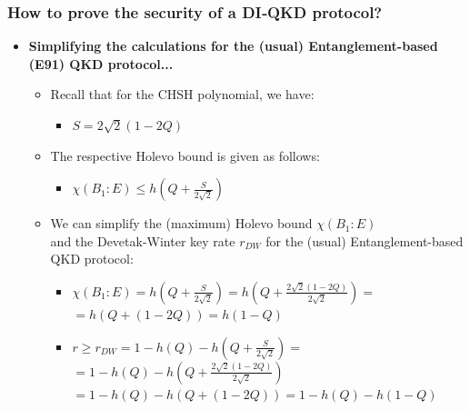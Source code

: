 \documentclass{beamer}
\begin{document}
		\begin{frame}
			\frametitle{\large How to prove the security of a DI‑QKD protocol?}

            \vspace{4ex}
            \begin{itemize}
                \item \textbf{Simplifying the calculations for the (usual) Entanglement-based (E91) QKD protocol...}
                \begin{itemize}
                    \item Recall that for the CHSH polynomial, we have:
                    \begin{itemize}\footnotesize
                        \item $S = 2 \sqrt{2}(1 - 2Q)$
                    \end{itemize}
                    \vspace{0.5ex}
                    \item The respective Holevo bound is given as follows:
                    \begin{itemize}\footnotesize
                        \item $\chi({B}_{1}:E) \leq h\left( Q + \frac{S}{2 \sqrt{2}} \right)$
                    \end{itemize}
                    \vspace{0.5ex}
                    \item We can simplify the (maximum) Holevo bound $\chi({B}_{1}:E)$\\ and the Devetak-Winter key rate ${r}_{DW}$ for the (usual) Entanglement-based QKD protocol:
                    \begin{itemize}\footnotesize
                        \item $\chi({B}_{1}:E) = h\left( Q + \frac{S}{2 \sqrt{2}} \right) = h\left( Q + \frac{2 \sqrt{2}(1 - 2Q)}{2 \sqrt{2}} \right) = $\\
                        \vspace{0.5ex}
                        \hspace{8ex}
                        $ = h\left( Q + (1 - 2Q) \right) = h\left( 1 - Q \right)$
                        \item $r \geq {r}_{DW} = 1 - h(Q) - h\left( Q + \frac{S}{2 \sqrt{2}} \right) = $\\
                        \vspace{0.25ex}
                        \hspace{6.8ex}$= 1 - h(Q) - h\left( Q + \frac{2 \sqrt{2}(1 - 2Q)}{2 \sqrt{2}} \right)$\\
                        \vspace{0.25ex}
                        \hspace{6.8ex}$= 1 - h(Q) - h\left( Q + (1 - 2Q) \right) = 1 - h(Q) - h(1 - Q)$\\
                    \end{itemize}
                \end{itemize}
            \end{itemize}
            
		\end{frame}
\end{document}
